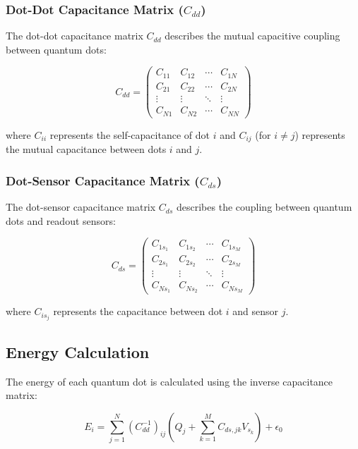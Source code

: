 \documentclass[11pt,a4paper]{article}
\begin{document}
\subsubsection{Dot-Dot Capacitance Matrix ($C_{dd}$)}

The dot-dot capacitance matrix $C_{dd}$ describes the mutual capacitive coupling between quantum dots:

\begin{equation}
C_{dd} = \begin{pmatrix}
C_{11} & C_{12} & \cdots & C_{1N} \\
C_{21} & C_{22} & \cdots & C_{2N} \\
\vdots & \vdots & \ddots & \vdots \\
C_{N1} & C_{N2} & \cdots & C_{NN}
\end{pmatrix}
\end{equation}

where $C_{ii}$ represents the self-capacitance of dot $i$ and $C_{ij}$ (for $i \neq j$) represents the mutual capacitance between dots $i$ and $j$.

\subsubsection{Dot-Sensor Capacitance Matrix ($C_{ds}$)}

The dot-sensor capacitance matrix $C_{ds}$ describes the coupling between quantum dots and readout sensors:

\begin{equation}
C_{ds} = \begin{pmatrix}
C_{1s_1} & C_{1s_2} & \cdots & C_{1s_M} \\
C_{2s_1} & C_{2s_2} & \cdots & C_{2s_M} \\
\vdots & \vdots & \ddots & \vdots \\
C_{Ns_1} & C_{Ns_2} & \cdots & C_{Ns_M}
\end{pmatrix}
\end{equation}

where $C_{is_j}$ represents the capacitance between dot $i$ and sensor $j$.

\subsection{Energy Calculation}

The energy of each quantum dot is calculated using the inverse capacitance matrix:

\begin{equation}
E_i = \sum_{j=1}^{N} (C_{dd}^{-1})_{ij} \left( Q_j + \sum_{k=1}^{M} C_{ds,jk} V_{s_k} \right) + \epsilon_0
\end{equation}
\end{document}

